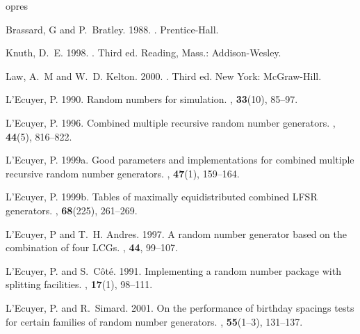 \documentclass[12pt]{article}
\newif\iflong\longfalse
\newenvironment {refer}{
  \begin {list}{}{
  \def\newblock {\hskip .11em plus .33em minus .07em}
  \setlength {\itemsep}{2pt}
  \setlength {\parsep}{0pt}
  \setlength {\parindent}{20pt}
  \setlength {\leftmargin}{+\parindent}
  \setlength {\itemindent}{-\parindent}}}{\end{list}}
\begin{document}
 {opres}


\iflong  %
\begin{refer}

Brassard, G and P.~Bratley. 1988.
.
\newblock Prentice-Hall.

Knuth, D.~E. 1998.
.
\newblock Third ed. Reading, Mass.: Addison-Wesley.

Law, A.~M and W.~D. Kelton. 2000.
.
\newblock Third ed. New York: McGraw-Hill.

L'Ecuyer, P. 1990.
\newblock Random numbers for simulation.
,  {\bf 33}(10), 85--97.

L'Ecuyer, P. 1996.
\newblock Combined multiple recursive random number generators.
,  {\bf 44}(5), 816--822.

L'Ecuyer, P. 1999a.
\newblock Good parameters and implementations for combined multiple recursive
  random number generators.
,  {\bf 47}(1), 159--164.

L'Ecuyer, P. 1999b.
\newblock Tables of maximally equidistributed combined {LFSR} generators.
,  {\bf 68}(225), 261--269.

L'Ecuyer, P and T.~H. Andres. 1997.
\newblock A random number generator based on the combination of four {LCG}s.
,  {\bf 44}, 99--107.

L'Ecuyer, P. and S.~C{\^o}t{\'e}. 1991.
\newblock Implementing a random number package with splitting facilities.
,  {\bf 17}(1),
  98--111.

L'Ecuyer, P. and R.~Simard. 2001.
\newblock On the performance of birthday spacings tests for certain families of
  random number generators.
,  {\bf 55}(1--3),
  131--137.


\end{refer}
\end{document}
